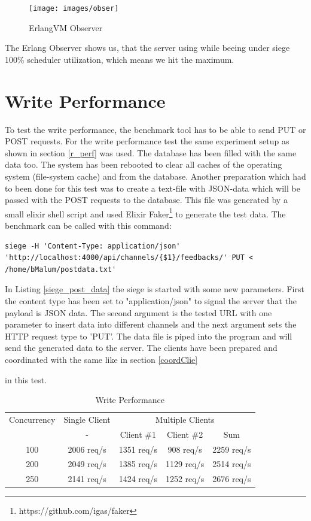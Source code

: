 \begin{figure}[H]
  \caption{ErlangVM Observer}
  \label{observer}
    \texttt{[image: images/obser]}
\end{figure}
The Erlang Observer shows us, that the server using while beeing under siege 100\% scheduler utilization, which means we hit the maximum. 

\section{Write Performance}\label{w_perf}
{\color{newcode} To test the write performance, the benchmark tool has to be able to send PUT or POST requests. For the write performance test the same experiment setup as shown in section \ref{r_perf} was used. The database has been filled with the same data too. The system has been rebooted to clear all caches of the operating system (file-system cache) and from the database.
Another preparation which had to been done for this test was to create a text-file with JSON-data which will be passed with the POST requests to the database. This file was generated by a small elixir shell script and used Elixir Faker\footnote{https://github.com/igas/faker} to generate the test data.
The benchmark can be called with this command:
\begin{lstlisting}[caption=Siege Post Data, label=siege_post_data]
siege -H 'Content-Type: application/json' 'http://localhost:4000/api/channels/{$1}/feedbacks/' PUT < /home/bMalum/postdata.txt' 
\end{lstlisting}
In Listing \ref{siege_post_data} the siege is started with some new parameters. First the content type has been set to "application/json" to signal the server that the payload is JSON data. The second argument is the tested URL with one parameter to insert data into different channels and the next argument sets the HTTP request type to 'PUT'. The data file is piped into the program and will send the generated data to the server. The clients have been prepared and coordinated with the same like in section \ref{coordClie} } in this test.

\begin{table}
 \caption{Write Performance}
\begin{tabular}{c||c|ccc}

Concurrency & Single Client  & \multicolumn{3}{c}{Multiple Clients} \\ 
 & - & Client \#1 & Client \#2 & Sum  \\ 
\hline 
100 & 2006 req/s &  1351 req/s & 908  req/s& 2259 req/s \\ 
\hline 
200 & 2049 req/s & 1385 req/s & 1129  req/s& 2514 req/s \\ 
\hline 
250 & 2141 req/s & 1424 req/s & 1252  req/s& 2676 req/s \\ 
 
\end{tabular} 
\end{table}

